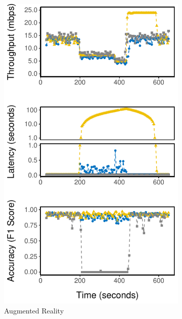 \begin{figure}
\begin{subfigure}{0.3\textwidth}
    \includegraphics[width=\textwidth]{figures/runtime-darknet-verticle.pdf}
    \caption{Augmented Reality}
    \label{fig:ar-runtime}
  \end{subfigure}
  \hfill
  \begin{subfigure}{0.3\textwidth}

\end{subfigure}
\end{figure}
